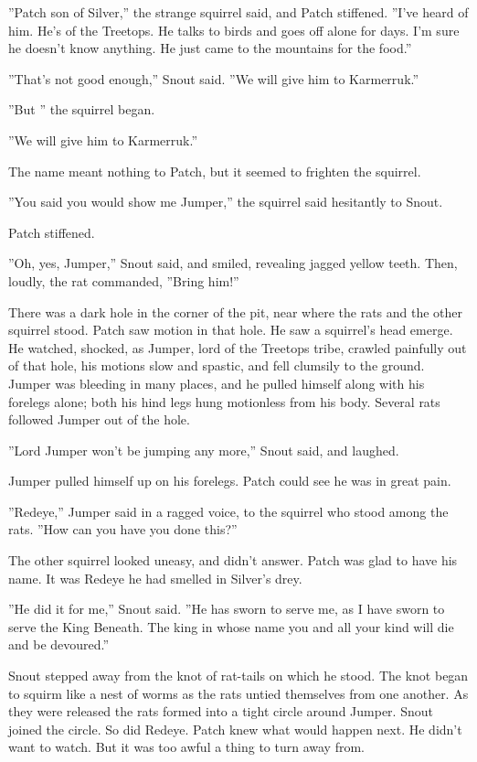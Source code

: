 \documentclass[12pt]{book}
\begin{document}
 ''Patch son of Silver,'' the strange squirrel said, and Patch stiffened. ''I've heard of him. He's of the Treetops. He talks to birds and goes off alone for days. I'm sure he doesn't know anything. He just came to the mountains for the food.''\par
 ''That's not good enough,'' Snout said. ''We will give him to Karmerruk.''\par
 ''But %
'' the squirrel began.\par
 ''We will give him to Karmerruk.''\par
 The name meant nothing to Patch, but it seemed to frighten the squirrel.\par
''You said you would show me Jumper,'' the squirrel said hesitantly to Snout.\par
 Patch stiffened.\par
 ''Oh, yes, Jumper,'' Snout said, and smiled, revealing jagged yellow teeth. Then, loudly, the rat commanded, ''Bring him!''\par
 There was a dark hole in the corner of the pit, near where the rats and the other squirrel stood. Patch saw motion in that hole. He saw a squirrel's head emerge. He watched, shocked, as Jumper, lord of the Treetops tribe, crawled painfully out of that hole, his motions slow and spastic, and fell clumsily to the ground. Jumper was bleeding in many places, and he pulled himself along with his forelegs alone; both his hind legs hung motionless from his body. Several rats followed Jumper out of the hole.\par
 ''Lord Jumper won't be jumping any more,'' Snout said, and laughed.\par
 Jumper pulled himself up on his forelegs. Patch could see he was in great pain.\par
 ''Redeye,'' Jumper said in a ragged voice, to the squirrel who stood among the rats. ''How can you have you done this?''\par
 The other squirrel looked uneasy, and didn't answer. Patch was glad to have his name. It was Redeye he had smelled in Silver's drey.\par
 ''He did it for me,'' Snout said. ''He has sworn to serve me, as I have sworn to serve the King Beneath. The king in whose name you and all your kind will die and be devoured.''\par
 Snout stepped away from the knot of rat-tails on which he stood. The knot began to squirm like a nest of worms as the rats untied themselves from one another. As they were released the rats formed into a tight circle around Jumper. Snout joined the circle. So did Redeye. Patch knew what would happen next. He didn't want to watch. But it was too awful a thing to turn away from.\par
\end{document}
